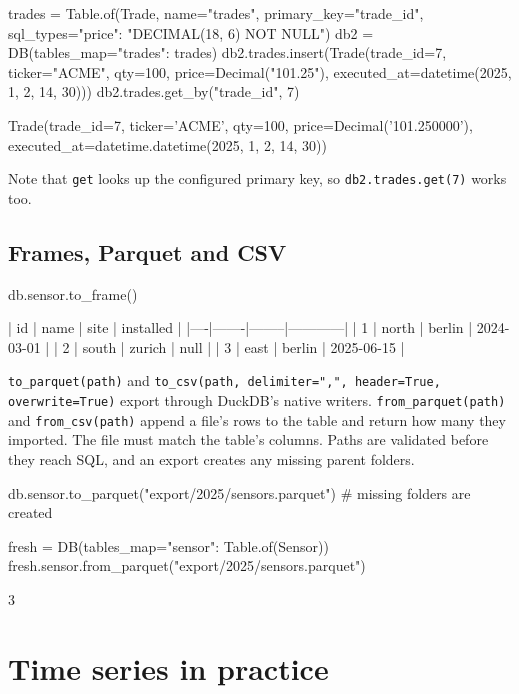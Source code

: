 \documentclass[11pt,a4paper]{article}
\newcommand{\code}[1]{\texttt{#1}}
\begin{document}
\begin{python}
trades = Table.of(Trade, name="trades", primary_key="trade_id",
                  sql_types={"price": "DECIMAL(18, 6) NOT NULL"})
db2 = DB(tables_map={"trades": trades})
db2.trades.insert(Trade(trade_id=7, ticker="ACME", qty=100,
                        price=Decimal("101.25"), executed_at=datetime(2025, 1, 2, 14, 30)))
db2.trades.get_by("trade_id", 7)
\end{python}
\begin{console}
Trade(trade_id=7, ticker='ACME', qty=100, price=Decimal('101.250000'),
      executed_at=datetime.datetime(2025, 1, 2, 14, 30))
\end{console}

Note that \code{get} looks up the configured primary key, so \code{db2.trades.get(7)} works
too.

\subsection{Frames, Parquet and CSV}

\begin{python}
db.sensor.to_frame()
\end{python}
\begin{console}
| id | name  | site   | installed  |
|----|-------|--------|------------|
| 1  | north | berlin | 2024-03-01 |
| 2  | south | zurich | null       |
| 3  | east  | berlin | 2025-06-15 |
\end{console}

\code{to\_parquet(path)} and \code{to\_csv(path, delimiter=",", header=True, overwrite=True)}
export through DuckDB's native writers. \code{from\_parquet(path)} and
\code{from\_csv(path)} append a file's rows to the table and return how many they
imported. The file must match the table's columns. Paths are validated before they reach
SQL, and an export creates any missing parent folders.

\begin{python}
db.sensor.to_parquet("export/2025/sensors.parquet")    # missing folders are created

fresh = DB(tables_map={"sensor": Table.of(Sensor)})
fresh.sensor.from_parquet("export/2025/sensors.parquet")
\end{python}
\begin{console}
3
\end{console}

\section{Time series in practice}
\end{document}
